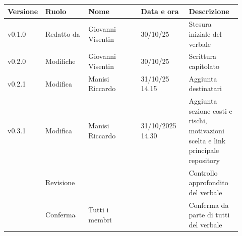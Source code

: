 \documentclass[a4paper,12pt]{article}
\begin{document}
\begin{center}
\small
\renewcommand{\arraystretch}{1.2} 
\begin{tabular}{|p{0.1\linewidth}|p{0.18\linewidth}|p{0.22\linewidth}|p{0.20\linewidth}|p{0.22\linewidth}|}
\hline
\rowcolor{gray!60} 
\textbf{Versione} & \textbf{Ruolo} & \textbf{Nome} & \textbf{Data e ora} & \textbf{Descrizione} \\
\hline
\rowcolor{white}
v0.1.0 & Redatto da & Giovanni Visentin & 30/10/25 & Stesura iniziale del verbale \\
\hline
\rowcolor{gray!20}
v0.2.0 & Modifiche & Giovanni Visentin & 30/10/25 &  Scrittura capitolato\\
\hline
\rowcolor{white}
v0.2.1 & Modifica & Manisi Riccardo & 31/10/25 14.15 & Aggiunta destinatari \\
\hline
\rowcolor{gray!20}
v0.3.1 & Modifica & Manisi Riccardo & 31/10/2025 14.30 & Aggiunta sezione costi e rischi, motivazioni scelta e link principale repository \\
\hline
\rowcolor{white}
 & Revisione &  &  & Controllo approfondito del verbale \\
\hline
\rowcolor{gray!20}
 & Conferma & Tutti i membri &  & Conferma da parte di tutti del verbale \\
\hline

\end{tabular}
\end{center}
\end{document}

